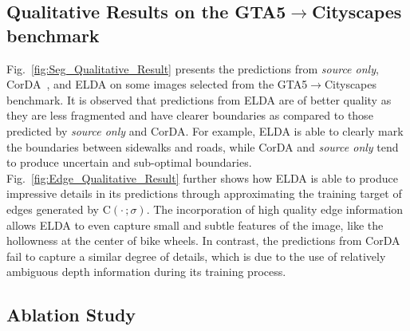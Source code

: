 \documentclass{bmvc2k}
\newcommand{\C}{\text{C}}
\begin{document}
\subsection{Qualitative Results on the GTA5$\to$Cityscapes benchmark}
\label{subsec::qualitative_result}


Fig.~\ref{fig:Seg_Qualitative_Result} presents the predictions from \textit{source only}, CorDA~\cite{wang2021domain}, and ELDA on some images selected from the GTA5$\to$Cityscapes benchmark. It is observed that predictions from ELDA are of better quality as they are less fragmented and have clearer boundaries as compared to those predicted by \textit{source only} and CorDA. For example, ELDA is able to clearly mark the boundaries between sidewalks and roads, while CorDA and \textit{source only} tend to produce uncertain and sub-optimal boundaries.  Fig.~\ref{fig:Edge_Qualitative_Result} further shows how ELDA is able to produce impressive details in its predictions through approximating the training target of edges generated by $\C(\cdot\,;\sigma)$. The incorporation of high quality edge information allows ELDA to even capture small and subtle features of the image, like the hollowness at the center of bike wheels. In contrast, the predictions from CorDA fail to capture a similar degree of details, which is due to the use of relatively ambiguous depth information during its training process.








\subsection{Ablation Study}
\label{subsec::ablation_study}
\end{document}
